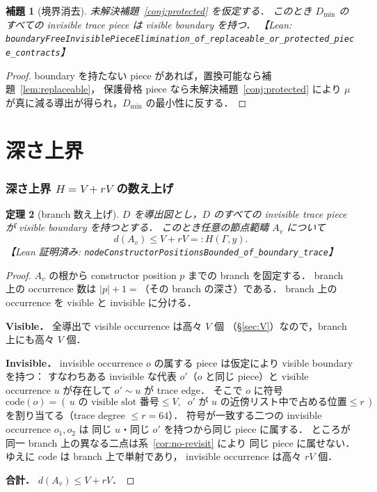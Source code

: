 \documentclass[paper=a4,fontsize=10pt,jafontscale=0.92]{jlreq}
\theoremstyle{plain}
\newtheorem{theorem}{定理}
\newtheorem{lemma}[theorem]{補題}
\theoremstyle{definition}
\theoremstyle{remark}
\newcommand{\Dmin}{D_{\min}}
\newcommand{\lean}[1]{\texttt{#1}}
\begin{document}
\begin{lemma}[境界消去]
\label{lem:boundary}
未解決補題~\ref{conj:protected} を仮定する．
このとき $\Dmin$ のすべての invisible trace piece は visible boundary を持つ．
【Lean: \lean{boundaryFreeInvisiblePieceElimination\_of\_replaceable\_or\_protected\_piece\_contracts}】
\end{lemma}

\begin{proof}
boundary を持たない piece があれば，置換可能なら補題~\ref{lem:replaceable}，
保護骨格 piece なら未解決補題~\ref{conj:protected} により
$\mu$ が真に減る導出が得られ，$\Dmin$ の最小性に反する．
\end{proof}

\part{深さ上界}

\section{深さ上界 $H = V + rV$ の数え上げ}
\label{sec:depth}

\begin{theorem}[branch 数え上げ]
\label{thm:count}
$D$ を導出図とし，$D$ のすべての invisible trace piece が
visible boundary を持つとする．
このとき任意の節点範疇 $A_v$ について
\[
  d(A_v) \le V + rV =: H(\Gamma, y).
\]
【Lean 証明済み: \lean{nodeConstructorPositionsBounded\_of\_boundary\_trace}】
\end{theorem}

\begin{proof}
$A_v$ の根から constructor position $p$ までの branch を固定する．
branch 上の occurrence 数は $|p|+1 = $（その branch の深さ）である．
branch 上の occurrence を visible と invisible に分ける．

\medskip
\noindent\textbf{Visible．} 全導出で visible occurrence は高々 $V$ 個
（\S\ref{sec:V}）なので，branch 上にも高々 $V$ 個．

\medskip
\noindent\textbf{Invisible．}
invisible occurrence $o$ の属する piece は仮定により visible boundary を持つ：
すなわちある invisible な代表 $o'$（$o$ と同じ piece）と
visible occurrence $u$ が存在して $o' \sim u$ が trace edge．
そこで $o$ に符号
\[
  \mathrm{code}(o) = (\,u \text{ の visible slot 番号} \le V,\;\;
  o' \text{ が } u \text{ の近傍リスト中で占める位置} \le r\,)
\]
を割り当てる（trace degree $\le r = 64$）．
符号が一致する二つの invisible occurrence $o_1, o_2$ は
同じ $u$・同じ $o'$ を持つから同じ piece に属する．
ところが同一 branch 上の異なる二点は系~\ref{cor:no-revisit} により
同じ piece に属せない．ゆえに $\mathrm{code}$ は branch 上で単射であり，
invisible occurrence は高々 $rV$ 個．

\medskip
\noindent\textbf{合計．} $d(A_v) \le V + rV$．
\end{proof}
\end{document}
